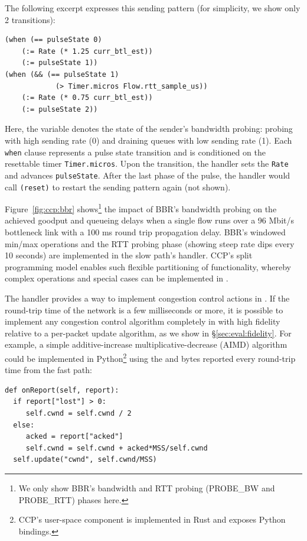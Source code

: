 The following excerpt expresses this sending pattern (for simplicity, we show only 2 transitions):
{\footnotesize
\begin{verbatim}
(when (== pulseState 0)
    (:= Rate (* 1.25 curr_btl_est))
    (:= pulseState 1))
(when (&& (== pulseState 1)
            (> Timer.micros Flow.rtt_sample_us))
    (:= Rate (* 0.75 curr_btl_est))
    (:= pulseState 2))
\end{verbatim}
}

Here, the variable  denotes the state of the sender's
bandwidth probing: probing with high sending rate (0) and draining queues with low
sending rate (1).
Each \texttt{when} clause represents a pulse state transition and is conditioned on the
resettable timer \texttt{Timer.micros}.
Upon the transition, the handler sets the \texttt{Rate} and advances \texttt{pulseState}.
After the last phase of the pulse, the handler would call \texttt{(reset)} to restart the sending pattern again (not shown).

Figure~\ref{fig:ccp:bbr} shows\footnote{We only show BBR's bandwidth and RTT probing (PROBE\_BW and PROBE\_RTT) phases here.}
the impact of BBR's bandwidth probing on the
achieved goodput and queueing delays when a single flow runs over a 96 Mbit/s
bottleneck link with a 100 ms round trip propagation delay.
%
BBR's windowed min/max operations and the RTT probing phase (showing steep rate
dips every 10 seconds) are implemented in the slow path's 
handler.
%
CCP's split programming model enables such flexible partitioning of
functionality, whereby complex operations and special cases can be implemented
in \userspace.

 The  handler provides a way to
implement congestion control actions in \userspace.
If the round-trip time of the network is a few milliseconds or more,
it is possible to implement any congestion control algorithm completely in \userspace
with high fidelity relative to a per-packet update algorithm, as we show in \S\ref{sec:eval:fidelity}.
For example, a simple additive-increase
multiplicative-decrease (AIMD) algorithm could be implemented in Python\footnote{CCP's user-space component is implemented in Rust and exposes Python bindings.} using
the  and  bytes reported every round-trip time from the fast
path:

{\footnotesize
\begin{verbatim}
def onReport(self, report):
  if report["lost"] > 0:
     self.cwnd = self.cwnd / 2
  else:
     acked = report["acked"]
     self.cwnd = self.cwnd + acked*MSS/self.cwnd
  self.update("cwnd", self.cwnd/MSS)
\end{verbatim}
}

